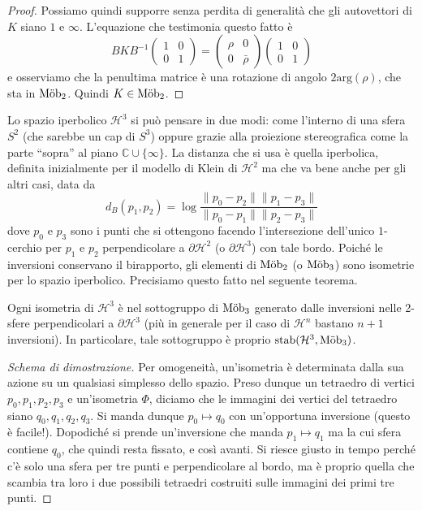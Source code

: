 \begin{proof}
	Possiamo quindi supporre senza perdita di generalità che gli autovettori di $K$ siano $1$ e $\infty$. L'equazione che testimonia questo fatto è 
	$$BKB^{-1}\begin{pmatrix}1 & 0\\ 0& 1\end{pmatrix} = \begin{pmatrix}\rho & 0\\ 0& \bar\rho\end{pmatrix}\begin{pmatrix}1 & 0\\ 0& 1\end{pmatrix} $$
	e osserviamo che la penultima matrice è una rotazione di angolo $2\text{arg}(\rho)$, che sta in $\operatorname{M\ddot ob}_{2}$. Quindi $K\in\operatorname{M\ddot ob}_{2}$.
\end{proof}

Lo spazio iperbolico $\mathcal H^{3}$ si può pensare in due modi: come l'interno di una sfera $S^{2}$ (che sarebbe un cap di $S^{3}$) oppure grazie alla proiezione stereografica come la parte ``sopra'' al piano $\mathbb C\cup\{\infty\}$. 
La distanza che si usa è quella iperbolica, definita inizialmente per il modello di Klein di $\mathcal H^{2}$ ma che va bene anche per gli altri casi, data da 
$$d_{B}(p_{1}, p_{2}) = \log\frac{\|p_{0} - p_{2}\|\|p_{1} - p_{3}\|}{\|p_{0} - p_{1}\|\|p_{2} - p_{3}\|}$$
dove $p_{0}$ e $p_{3}$ sono i punti che si ottengono facendo l'intersezione dell'unico $1$-cerchio per $p_{1}$ e $p_{2}$ perpendicolare a $\partial \mathcal H^{2}$ (o $\partial \mathcal H^{3}$) con tale bordo. 
Poiché le inversioni conservano il birapporto, gli elementi di $\operatorname{M\ddot ob}_{2}$ (o $\operatorname{M\ddot ob}_{3}$) sono isometrie per lo spazio iperbolico. Precisiamo questo fatto nel seguente teorema.

\begin{teorema}
	Ogni isometria di $\mathcal H^{3}$ è nel sottogruppo di $\operatorname{M\ddot ob}_{3}$ generato dalle inversioni nelle 2-sfere perpendicolari a $\partial\mathcal H^{3}$ (più in generale per il caso di $\mathcal H^{n}$ bastano $n+1$ inversioni). In particolare, tale sottogruppo è proprio $\operatorname{stab} (\mathcal H^{3}, \operatorname{M\ddot ob}_{3})$.
\end{teorema}
\begin{proof}[Schema di dimostrazione]
	Per omogeneità, un'isometria è determinata dalla sua azione su un qualsiasi simplesso dello spazio. 
	Preso dunque un tetraedro di vertici $p_{0}, p_{1}, p_{2}, p_{3}$ e un'isometria $\Phi$, diciamo che le immagini dei vertici del tetraedro siano $q_{0}, q_{1}, q_{2}, q_{3}$. 
	Si manda dunque $p_{0}\mapsto q_{0}$ con un'opportuna inversione (questo è facile!). 
	Dopodiché si prende un'inversione che manda $p_{1}\mapsto q_{1}$ ma la cui sfera contiene $q_{0}$, che quindi resta fissato, e così avanti. 
	Si riesce giusto in tempo perché c'è solo una sfera per tre punti e perpendicolare al bordo, ma è proprio quella che scambia tra loro i due possibili tetraedri costruiti sulle immagini dei primi tre punti.
\end{proof}

